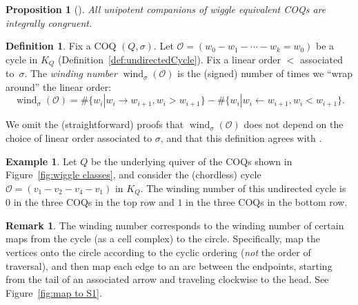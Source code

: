 \documentclass[11pt, letterpaper]{amsart}
\newtheorem{proposition}[theorem]{Proposition}
\theoremstyle{definition}
\newtheorem{remark}[theorem]{Remark}
\newtheorem{example}[theorem]{Example}
\newtheorem{definition}[theorem]{Definition}
\numberwithin{equation}{section}
\def\wind{{\operatorname{wind}}}
\begin{document}
\begin{proposition}[{\cite[Proposition 4.5]{COQ}}]
\label{prop:wiggle preserves U}
All unipotent companions of wiggle equivalent COQs are integrally congruent.
\end{proposition}

\begin{definition} %
\label{def:winding formula}
Fix a COQ $(Q, \sigma)$.
Let $\mathcal O = (w_0 - w_1 - \cdots - w_k=w_0)$ be a cycle in $K_Q$ (Definition~\ref{def:undirectedCycle}).
Fix a linear order $<$ associated to~$\sigma$.
The \emph{winding number} $\wind_\sigma(\mathcal O)$ is the (signed) number of times we ``wrap around'' the linear order: 
\begin{equation}
\label{eq:wind formula}
\wind_\sigma(\mathcal O) = \# \{ w_i | w_i \rightarrow w_{i+1}, w_i >  w_{i+1} \} -\#\{ w_i | w_i \leftarrow w_{i+1}, w_i <  w_{i+1}  \}.
\end{equation}
\end{definition}

We omit the (straightforward) proofs that $\wind_\sigma(\mathcal O)$ does not depend on the choice of linear order associated to $\sigma$, and that this definition agrees with \cite[Definition~2.10]{COQ}.

\begin{example}
Let $Q$ be the underlying quiver of the COQs shown in Figure~\ref{fig:wiggle classes}, and
consider the (chordless) cycle $\mathcal O = (v_1 - v_2 - v_4 - v_1)$ in $K_Q$.
The winding number of this undirected cycle is $0$ in the three COQs in the top row and $1$ in the three COQs in the bottom row. %
\end{example}

\begin{remark}
\label{rem:winding number topology}
The winding number corresponds to the winding number of certain maps from the cycle (as a cell complex) to the circle.
Specifically, map the vertices onto the circle according to the cyclic ordering (\emph{not} the order of traversal), and then map each edge to an arc between the endpoints, starting from the tail of an associated arrow and traveling clockwise to the head. See Figure~\ref{fig:map to S1}.
\end{remark}
\end{document}
